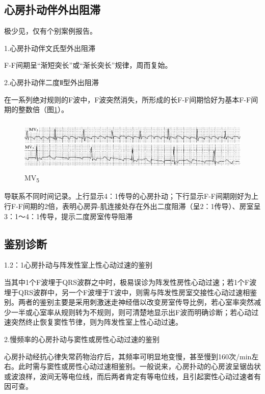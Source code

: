 \protect\hypertarget{text00020.htmlux5cux23subid196}{}{}

\subsection{心房扑动伴外出阻滞}

极少见，仅有个别案例报告。

1.心房扑动伴文氏型外出阻滞

F-F间期呈“渐短突长”或“渐长突长”规律，周而复始。

2.心房扑动伴二度Ⅱ型外出阻滞

在一系列绝对规则的F波中，F波突然消失，所形成的长F-F间期恰好为基本F-F间期的整数倍（图\ref{fig13-13}）。

\begin{figure}[!htbp]
 \centering
 \includegraphics[width=5.58333in,height=1in]{./images/Image00221.jpg}
 \captionsetup{justification=centering}
 \caption{MV\textsubscript{5}}
 \label{fig13-13}
  \end{figure} 
导联系不同时间记录。上行显示4：1传导的心房扑动；下行显示F-F间期刚好为上行F-F间期的2倍，表明心房异-肌连接处存在外出二度阻滞（呈2：1传导）、房室呈3：1～4：1传导，提示二度房室传导阻滞

\protect\hypertarget{text00020.htmlux5cux23subid197}{}{}

\subsection{鉴别诊断}

1.2：1心房扑动与阵发性室上性心动过速的鉴别

当其中1个F波埋于QRS波群之中时，极易误诊为阵发性房性心动过速；若1个F波埋于QRS波群中，另一个F波埋于T波中，则需与阵发性房室交接性心动过速相鉴别。两者的鉴别主要是采用刺激迷走神经借以改变房室传导比例，若心室率突然减少一半或心室率从规则转为不规则，则可清楚地显示出F波而明确诊断；若心动过速突然终止恢复窦性节律，则为阵发性室上性心动过速。

2.慢频率的心房扑动与窦性或房性心动过速的鉴别

心房扑动经抗心律失常药物治疗后，其频率可明显地变慢，甚至慢到160次/min左右。此时需与窦性或房性心动过速相鉴别。一般说来，心房扑动的心房波呈锯齿状或波浪样，波间无等电位线，而后两者肯定有等电位线，且引起窦性心动过速者有因可查。

